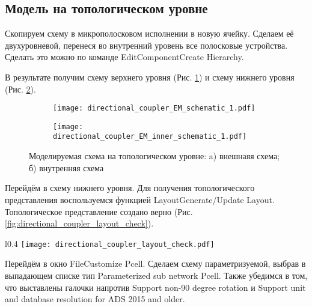 \subsection{Модель на топологическом уровне}

Скопируем схему в микрополосковом исполнении в новую ячейку. Сделаем её двухуровневой, перенеся во внутренний уровень все полосковые устройства. Сделать это можно по команде Edit\textrightarrow Component\textrightarrow Create Hierarchy.

В результате получим схему верхнего уровня (Рис. \ref{fig:directional_coupler_EM_schematic}) и схему нижнего уровня (Рис. \ref{fig:directional_coupler_EM_inner_schematic}).

\begin{figure}[!ht]
    \centering
    \begin{subfigure}[b]{0.45\textwidth}
        \centering
        \texttt{[image: directional\_coupler\_EM\_schematic\_1.pdf]}
        \caption{}
        \label{fig:directional_coupler_EM_schematic}
    \end{subfigure}
    \hfill
    \begin{subfigure}[b]{0.45\textwidth}
        \centering
        \texttt{[image: directional\_coupler\_EM\_inner\_schematic\_1.pdf]}
        \caption{}
        \label{fig:directional_coupler_EM_inner_schematic}
    \end{subfigure}
    \caption{
        Моделируемая схема на топологическом уровне:
        a) внешнаяя схема;
        б) внутренняя схема
    }
    \label{fig:directional_coupler_EM_schematics}
\end{figure}

Перейдём в схему нижнего уровня. Для получения топологического представления воспользуемся функцией Layout\textrightarrow Generate/Update Layout.
Топологическое представление создано верно (Рис. \ref{fig:directional_coupler_layout_check}).

\begin{wrapfigure}{l}{0.4\textwidth}
    \centering
    \texttt{[image: directional\_coupler\_layout\_check.pdf]}
    \caption{Проверка топологического представления}
    \label{fig:directional_coupler_layout_check}
\end{wrapfigure}

Перейдём в окно File\textrightarrow Customize Pcell.
Сделаем схему параметризуемой, выбрав в выпадающем списке тип Parameterized sub network Pcell.
Также убедимся в том, что выставлены галочки напротив Support non-90 degree rotation и Support unit and database resolution for ADS 2015 and older.

